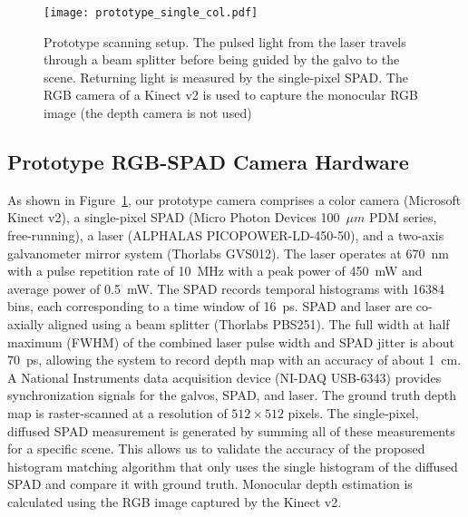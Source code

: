 \begin{figure}[t!]
	\centering
  \texttt{[image: prototype\_single\_col.pdf]}
  \caption{Prototype scanning setup. The pulsed light from the laser travels
    through a beam splitter before being guided by the galvo to the scene.
    Returning light is measured by the single-pixel SPAD. The RGB camera of a
    Kinect v2 is used to capture the monocular RGB image (the depth camera is
    not used)}
  \label{fig:prototype}
\end{figure}

\subsection{Prototype RGB-SPAD Camera Hardware}


As shown in Figure~\ref{fig:prototype}, our prototype camera comprises a color camera (Microsoft Kinect v2), a single-pixel SPAD (Micro Photon Devices 100~$\mu m$ PDM series, free-running), a laser (ALPHALAS PICOPOWER-LD-450-50), and a two-axis galvanometer mirror system (Thorlabs GVS012). The laser operates at 670~nm with a pulse repetition rate of 10~MHz with a peak power of 450~mW and average power of 0.5~mW. The SPAD records temporal histograms with 16384 bins, each corresponding to a time window of 16~ps. SPAD and laser are co-axially aligned using a beam splitter (Thorlabs PBS251). The full width at half maximum (FWHM) of the combined laser pulse width and SPAD jitter is about 70~ps, allowing the system to record depth map with an accuracy of about 1~cm. A National Instruments data acquisition device (NI-DAQ USB-6343) provides synchronization signals for the galvos, SPAD, and laser. The ground truth depth map is raster-scanned at a resolution of $512 \times 512$ pixels. The single-pixel, diffused SPAD measurement is generated by summing all of these measurements for a specific scene. This allows us to validate the accuracy of the proposed histogram matching algorithm that only uses the single histogram of the diffused SPAD and compare it with ground truth. Monocular depth estimation is calculated using the RGB image captured by the Kinect v2.


